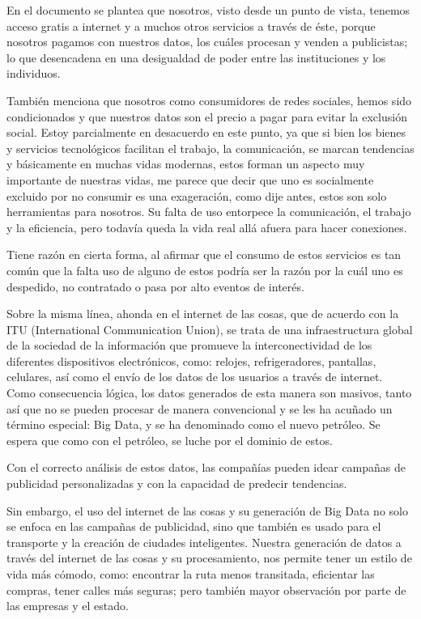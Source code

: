 \documentclass[12pt]{report}
\begin{document}
\begin{enumerate}[label=\textbf{\arabic*.}, leftmargin=*]
En el documento se plantea que nosotros, visto desde un punto de vista, tenemos acceso gratis a internet y a muchos otros servicios a través de éste, porque nosotros pagamos con nuestros datos, los cuáles procesan y venden a publicistas; lo que desencadena en una desigualdad de poder entre las instituciones y los individuos.

También menciona que nosotros como consumidores de redes sociales, hemos sido condicionados y que nuestros datos son el precio a pagar para evitar la exclusión social. Estoy parcialmente en desacuerdo en este punto, ya que si bien los bienes y servicios tecnológicos facilitan el trabajo, la comunicación, se marcan tendencias y básicamente en muchas vidas modernas, estos forman un aspecto muy importante de nuestras vidas, me parece que decir que uno es socialmente excluido por no consumir  es una exageración, como dije antes, estos son solo herramientas para nosotros. Su falta de uso entorpece la comunicación, el trabajo y la eficiencia, pero todavía queda la vida real allá afuera para hacer conexiones.

Tiene razón en cierta forma, al afirmar que el consumo de estos servicios es tan común que la falta uso de alguno de estos podría ser la razón por la cuál uno es despedido, no contratado o pasa por alto eventos de interés.

Sobre la misma línea, ahonda en el internet de las cosas, que de acuerdo con la ITU (International Communication Union), se trata de una infraestructura global de la sociedad de la información que promueve la interconectividad de los diferentes dispositivos electrónicos, como: relojes, refrigeradores, pantallas, celulares, así como el envío de los datos de los usuarios a través de internet. Como consecuencia lógica, los datos generados de esta manera son masivos, tanto así que no se pueden procesar de manera convencional y se les ha acuñado un término especial: Big Data, y se ha denominado como el nuevo petróleo. Se espera que como con el petróleo, se luche por el dominio de estos.

Con el correcto análisis de estos datos, las compañías pueden idear campañas de publicidad personalizadas y con la capacidad de predecir tendencias.

Sin embargo, el uso del internet de las cosas y su generación de Big Data no solo se enfoca en las campañas de publicidad, sino que también es usado para el transporte y  la creación de ciudades inteligentes. Nuestra generación de datos a través del internet de las cosas y su procesamiento, nos permite tener un estilo de vida más cómodo, como: encontrar la ruta menos transitada, eficientar las compras, tener calles más seguras; pero también mayor observación por parte de las empresas y el estado.


\end{enumerate}
\end{document}

